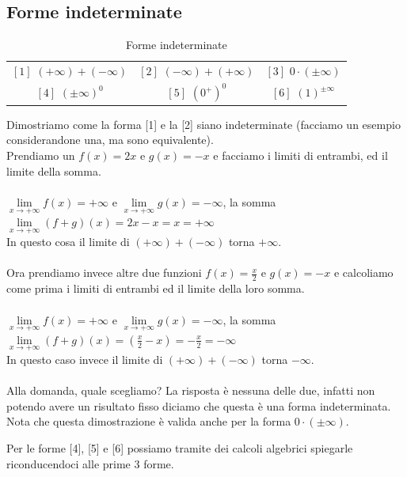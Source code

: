 \subsection{Forme indeterminate}
\begin{table}[h!]
    \setlength{\tabcolsep}{7pt}
    \renewcommand{\arraystretch}{1.5}
    \centering
    \begin{tabular}{|c c c|}
        \hline
        $[1]$ $(+\infty) + (-\infty)$ & $[2]$ $(-\infty) + (+\infty)$ & $[3]$ $0 \cdot (\pm \infty)$ \\
        $[4]$ $(\pm \infty)^0$ & $[5]$ $(0^+)^0$ & $[6]$ $(1)^{\pm \infty}$\\ 
        \hline
    \end{tabular}
    \caption{Forme indeterminate}
\end{table}
\begin{demostration}
Dimostriamo come la forma [1] e la [2] siano indeterminate (facciamo un esempio considerandone una, ma sono equivalente).\\
Prendiamo un $f(x) = 2x$ e $g(x) = -x$ e facciamo i limiti di entrambi, ed il limite della somma.\\\\
$\lim\limits_{x\to +\infty}f(x) = +\infty$ e $\lim\limits_{x\to +\infty}g(x) = -\infty$, la somma $\lim\limits_{x\to +\infty}(f + g)(x) = 2x - x = x = +\infty$\\
In questo cosa il limite di $(+\infty) + (-\infty)$ torna $+\infty$.\\ \\
Ora prendiamo invece altre due funzioni $f(x) = \frac{x}{2}$ e $g(x) = -x$ e calcoliamo come prima i limiti di entrambi ed il limite della loro somma.\\\\
$\lim\limits_{x\to +\infty}f(x) = +\infty$ e $\lim\limits_{x\to +\infty}g(x) = -\infty$, la somma $\lim\limits_{x\to +\infty}(f + g)(x) = (\frac{x}{2} - x) = -\frac{x}{2} = -\infty$\\
In questo caso invece il limite di $(+\infty) + (-\infty)$ torna $-\infty$.\\\\
Alla domanda, quale scegliamo? La risposta è nessuna delle due, infatti non potendo avere un risultato fisso diciamo che questa è una forma indeterminata.\\
Nota che questa dimostrazione è valida anche per la forma $0 \cdot (\pm \infty)$.
\end{demostration}
Per le forme [4], [5] e [6] possiamo tramite dei calcoli algebrici spiegarle riconducendoci alle prime 3 forme.\\\\
